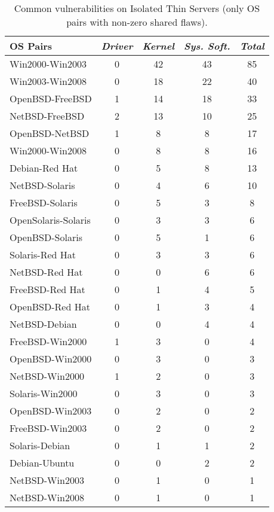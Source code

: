 \begin{table}[!ht]
\caption{Common vulnerabilities on Isolated Thin Servers (only OS pairs with non-zero shared flaws).}
\label{tab:class-pairs}
\begin{center}
{\scriptsize
\begin{tabular}{|l||c|c|c||c|}\hline
OS Pairs & \emph{Driver} & \emph{Kernel} & \emph{Sys. Soft.} & \emph{Total}\\\hline\hline
Win2000-Win2003 &  0 & 42 & 43 & 85 \\\hline
Win2003-Win2008 &  0 & 18 & 22 & 40  \\\hline
OpenBSD-FreeBSD &  1 & 14  &  18 & 33  \\\hline
NetBSD-FreeBSD &  2 & 13 & 10 & 25  \\\hline
OpenBSD-NetBSD  & 1 & 8 & 8 & 17\\\hline
Win2000-Win2008 &  0 & 8 & 8 & 16  \\\hline
Debian-Red Hat &  0 & 5 & 8 & 13  \\\hline
NetBSD-Solaris &  0 & 4 & 6 & 10  \\\hline
FreeBSD-Solaris &  0 & 5 & 3 & 8  \\\hline
OpenSolaris-Solaris &  0 & 3 & 3 & 6  \\\hline
OpenBSD-Solaris  &  0 & 5 & 1 & 6  \\\hline
Solaris-Red Hat &  0 & 3 & 3 & 6  \\\hline
NetBSD-Red Hat &  0 & 0 & 6 & 6  \\\hline
FreeBSD-Red Hat &  0 & 1 & 4 & 5 \\\hline
OpenBSD-Red Hat &  0 & 1 &  3 & 4  \\\hline
NetBSD-Debian &  0 & 0 & 4 & 4  \\\hline
FreeBSD-Win2000 &  1 & 3 & 0 & 4  \\\hline
OpenBSD-Win2000 &  0 & 3 &  0 & 3  \\\hline
NetBSD-Win2000 &  1 & 2 & 0 & 3  \\\hline
Solaris-Win2000 &  0 & 3 & 0 & 3  \\\hline
OpenBSD-Win2003 &  0 & 2 & 0 & 2  \\\hline
FreeBSD-Win2003 &  0 & 2 & 0 & 2  \\\hline
Solaris-Debian &  0 & 1 & 1 & 2  \\\hline
Debian-Ubuntu &  0 & 0 & 2 & 2  \\\hline
NetBSD-Win2003 &  0 & 1 & 0 & 1  \\\hline
NetBSD-Win2008 &  0 & 1 & 0 & 1  \\\hline

\end{tabular}}
\end{center}
\end{table}
